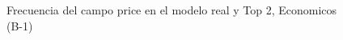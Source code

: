 \begin{figure}[H]
    \centering
    
    \caption{Frecuencia del campo  price en el modelo real y Top 2, Economicos (B-1)}
    \label{frecuency- Price-top2}
\end{figure}
